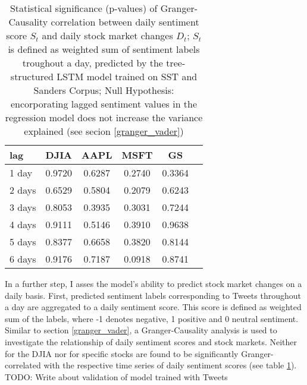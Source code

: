 \documentclass[a4paper,12pt]{article}%
\begin{document}
\begin{table}
\centering
\captionsetup{justification=centering}
\begin{tabular}{l|c c c c c}
\hline
lag & DJIA & AAPL & MSFT & GS \\ \hline
1 day   & 0.9720 & 0.6287 & 0.2740 & 0.3364 \\ 
2 days  & 0.6529 & 0.5804 & 0.2079 & 0.6243 \\ 
3 days  & 0.8053 & 0.3935 & 0.3031 & 0.7244 \\ 
4 days  & 0.9111 & 0.5146 & 0.3910 & 0.9638 \\ 
5 days  & 0.8377 & 0.6658 & 0.3820 & 0.8144 \\ 
6 days  & 0.9176 & 0.7187 & 0.0918 & 0.8741 \\ \hline

\end{tabular}
\caption{Statistical significance (p-values) of Granger-Causality correlation between daily sentiment score $S_t$ and daily stock market changes $D_t$; $S_t$ is defined as weighted sum of sentiment labels troughout a day, predicted by the tree-structured LSTM model trained on SST and Sanders Corpus; Null Hypothesis: encorporating lagged sentiment values in the regression model does not increase the variance explained (see secion \ref{granger_vader})\label{table:granger_lstm}}
\end{table}

In a further step, I asses the model's ability to predict stock market changes on a daily basis. First, predicted sentiment labels corresponding to Tweets throughout a day are aggregated to a daily sentiment score. This score is defined as weighted sum of the labels, where -1 denotes negative, 1 positive and 0 neutral sentiment. Similar to section \ref{granger_vader}, a Granger-Causality analysis is used to investigate the relationship of daily sentiment scores and stock markets. Neither for the DJIA nor for specific stocks are found to be significantly Granger-correlated with the respective time series of daily sentiment scores (see table \ref{table:granger_lstm}).\\

TODO: Write about validation of model trained with Tweets
\end{document}
